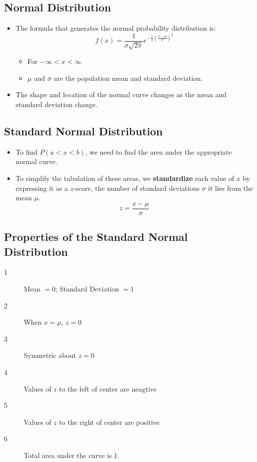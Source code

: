 \documentclass[12pt, letterpaper]{article}
\begin{document}
        \subsection{Normal Distribution}
            \begin{itemize}
                \item The formula that generates the normal probability distribution is:
                \begin{equation}
                    f(x) = \frac{1}{\sigma\sqrt{2\pi}}e^{-\frac{1}{2}\left(\frac{x-\mu}{\sigma}\right)^2}
                \end{equation}
                    \begin{itemize}
                        \item For $-\infty < x < \infty$
                        \item $\mu$ and $\sigma$ are the population mean and standard deviation.
                    \end{itemize}
                \item The shape and location of the normal curve changes as the mean and standard deviation change.
            \end{itemize}
        \subsection{Standard Normal Distribution}
            \begin{itemize}
                \item To find $P(a < x < b)$, we need to find the area under the appropriate normal curve.
                \item To simplify the tabulation of these areas, we \textbf{standardize} each value of $x$ by expressing it as a $z$-score, the number of standard deviations $\sigma$ it lies from the mean $\mu$.
                    \begin{equation}
                        z = \frac{x-\mu}{\sigma}
                    \end{equation}
            \end{itemize}
            \subsection*{Properties of the Standard Normal Distribution}
            \begin{description}
                \item[1] Mean $= 0$; Standard Deviation $= 1$
                \item[2] When $x = \mu$, $z = 0$
                \item[3] Symmetric about $z = 0$
                \item[4] Values of $z$ to the left of center are neagtive
                \item[5] Values of $z$ to the right of center are positive
                \item[6] Total area under the curve is 1.
            \end{description}
\end{document}
